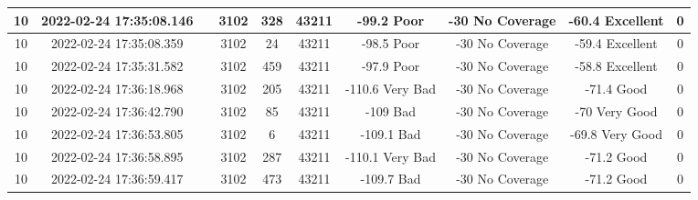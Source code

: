 \begin{longtable*}{|c|c|c|c|c|c|c|c|c|c|}
10&2022-02-24 17:35:08.146&&3102&328&43211& -99.2     Poor        & -30       No Coverage & -60.4     Excellent   & 0\\\hline
{}10&2022-02-24 17:35:08.359&&3102&24&43211& -98.5     Poor        & -30       No Coverage & -59.4     Excellent   & 0\\\hline
{}10&2022-02-24 17:35:31.582&&3102&459&43211& -97.9     Poor        & -30       No Coverage & -58.8     Excellent   & 0\\\hline
{}10&2022-02-24 17:36:18.968&&3102&205&43211& -110.6    Very Bad    & -30       No Coverage & -71.4     Good        & 0\\\hline
{}10&2022-02-24 17:36:42.790&&3102&85&43211& -109      Bad         & -30       No Coverage & -70       Very Good   & 0\\\hline
{}10&2022-02-24 17:36:53.805&&3102&6&43211& -109.1    Bad         & -30       No Coverage & -69.8     Very Good   & 0\\\hline
{}10&2022-02-24 17:36:58.895&&3102&287&43211& -110.1    Very Bad    & -30       No Coverage & -71.2     Good        & 0\\\hline
{}10&2022-02-24 17:36:59.417&&3102&473&43211& -109.7    Bad         & -30       No Coverage & -71.2     Good        & 0\\\hline

\end{longtable*}
